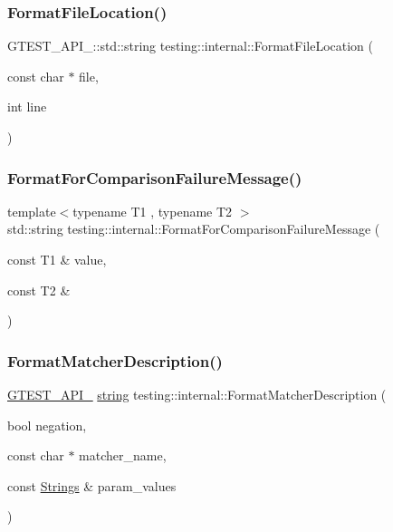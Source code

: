 \subsubsection{\texorpdfstring{Format\+File\+Location()}{FormatFileLocation()}}
{\footnotesize\ttfamily G\+T\+E\+S\+T\+\_\+\+A\+P\+I\+\_\+\+::std\+::string testing\+::internal\+::\+Format\+File\+Location (\begin{DoxyParamCaption}\item[{const char $\ast$}]{file,  }\item[{int}]{line }\end{DoxyParamCaption})}

\mbox{\label{namespacetesting_1_1internal_a91ab078f10adc669f09b7f604975c518}} 
\subsubsection{\texorpdfstring{Format\+For\+Comparison\+Failure\+Message()}{FormatForComparisonFailureMessage()}}
{\footnotesize\ttfamily template$<$typename T1 , typename T2 $>$ \\
std\+::string testing\+::internal\+::\+Format\+For\+Comparison\+Failure\+Message (\begin{DoxyParamCaption}\item[{const T1 \&}]{value,  }\item[{const T2 \&}]{ }\end{DoxyParamCaption})}

\mbox{\label{namespacetesting_1_1internal_a593b52fcbb46a765a31850661b1960f4}} 
\subsubsection{\texorpdfstring{Format\+Matcher\+Description()}{FormatMatcherDescription()}}
{\footnotesize\ttfamily \hyperlink{gtest-port_8h_aa73be6f0ba4a7456180a94904ce17790}{G\+T\+E\+S\+T\+\_\+\+A\+P\+I\+\_\+} \hyperlink{namespacetesting_1_1internal_a8e8ff5b11e64078831112677156cb111}{string} testing\+::internal\+::\+Format\+Matcher\+Description (\begin{DoxyParamCaption}\item[{bool}]{negation,  }\item[{const char $\ast$}]{matcher\+\_\+name,  }\item[{const \hyperlink{namespacetesting_1_1internal_a7706b17f05f4b49e351b052ae4e05073}{Strings} \&}]{param\+\_\+values }\end{DoxyParamCaption})}

